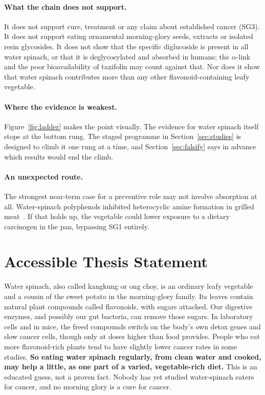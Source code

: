 \documentclass[11pt,a4paper]{article}
\begin{document}
\paragraph{What the chain does not support.} It does not support cure, treatment or any claim about established cancer (SG3). It does not support eating ornamental morning-glory seeds, extracts or isolated resin glycosides. It does not show that the specific diglucoside is present in all water spinach, or that it is deglycosylated and absorbed in humans; the $\alpha$-link and the poor bioavailability of taxifolin may count against that. Nor does it show that water spinach contributes more than any other flavonoid-containing leafy vegetable.

\paragraph{Where the evidence is weakest.} Figure~\ref{fig:ladder} makes the point visually. The evidence for water spinach itself stops at the bottom rung. The staged programme in Section~\ref{sec:studies} is designed to climb it one rung at a time, and Section~\ref{sec:falsify} says in advance which results would end the climb.

\paragraph{An unexpected route.} The strongest near-term case for a preventive role may not involve absorption at all. Water-spinach polyphenols inhibited heterocyclic amine formation in grilled meat~\cite{huang2026}. If that holds up, the vegetable could lower exposure to a dietary carcinogen in the pan, bypassing SG1 entirely.

\section{Accessible Thesis Statement}
\label{sec:accessible}

\begin{thesisbox}
Water spinach, also called kangkung or ong choy, is an ordinary leafy vegetable and a cousin of the sweet potato in the morning-glory family. Its leaves contain natural plant compounds called flavonoids, with sugars attached. Our digestive enzymes, and possibly our gut bacteria, can remove those sugars. In laboratory cells and in mice, the freed compounds switch on the body's own detox genes and slow cancer cells, though only at doses higher than food provides. People who eat more flavonoid-rich plants tend to have slightly lower cancer rates in some studies. \textbf{So eating water spinach regularly, from clean water and cooked, may help a little, as one part of a varied, vegetable-rich diet.} This is an educated guess, not a proven fact. Nobody has yet studied water-spinach eaters for cancer, and no morning glory is a cure for cancer.
\end{thesisbox}
\end{document}
